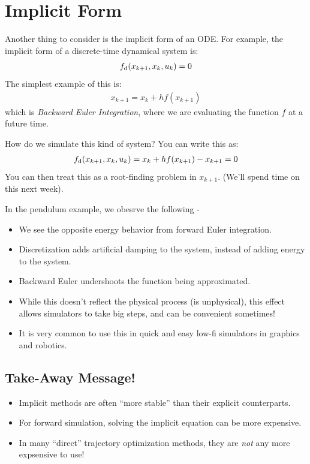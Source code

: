 \section{Implicit Form}
Another thing to consider is the implicit form of an ODE. For example, the implicit form of a discrete-time dynamical system is: 
\begin{align}
    f_{\rm d} (x_{k+1}, x_{k}, u_k) = 0
\end{align}
The simplest example of this is: 
\begin{align}
    x_{k+1} = x_{k} + h f(x_{k+1}) 
\end{align}
which is \textit{Backward Euler Integration}, where we are evaluating the function $f$ at a future time. 

\noindent
How do we simulate this kind of system? 
You can write this as: 
\begin{align}
    f_{\rm d} (x_{k+1}, x_k, u_k) = x_k + h f(x_{k+1}) - x_{k+1} = 0
\end{align}
You can then treat this as a root-finding problem in $x_{k+1}$. (We'll spend time on this next week). 

\noindent
In the pendulum example, we obesrve the following - 
\begin{itemize}
    \item We see the opposite energy behavior from forward Euler integration.
    \item Discretization adds artificial damping to the system, instead of adding energy to the system. 
    \item Backward Euler undershoots the function being approximated. 
    \item While this doesn't reflect the physical process (is unphysical), this effect allows simulators to take big steps, and can be convenient sometimes!
    \item It is very common to use this in quick and easy low-fi simulators in graphics and robotics. 
\end{itemize}

\subsection{Take-Away Message!}
\begin{itemize}
    \item Implicit methods are often ``more stable'' than their explicit counterparts. 
    \item For forward simulation, solving the implicit equation can be more expensive. 
    \item In many ``direct'' trajectory optimization methods, they are \textit{not} any more expsensive to use! 
\end{itemize}

